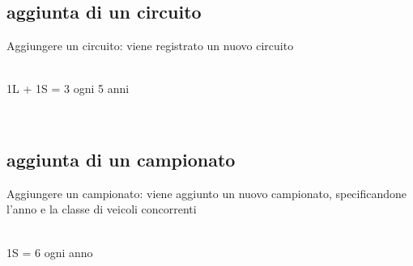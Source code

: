 \documentclass[a4paper,12pt]{report}
\begin{document}
	\subsection{aggiunta di un circuito}
	Aggiungere un circuito:
	viene registrato un nuovo circuito
	\begin{table}[!htb]
		\centering
		\begin{center}
		\newline\\
		1L + 1S = 3 ogni 5 anni\\
		\end{center}
	\end{table}\\
	\subsection{aggiunta di un campionato}
	Aggiungere un campionato:
	viene aggiunto un nuovo campionato, specificandone l'anno e la classe di veicoli concorrenti
	\begin{table}[!htb]
		\centering
		\begin{center}
		\newline\\
		1S = 6 ogni anno\\
		\end{center}
	\end{table}\\
\end{document}
